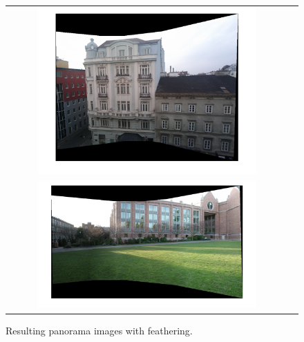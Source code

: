 \begin{figure}[h]
	\centering
	\begin{tabular}{cc}
	\includegraphics[width=0.8\textwidth]{figures/office_p.png} \\
	\includegraphics[width=0.8\textwidth]{figures/campus_p.png} 

	\end{tabular}
	\caption{Resulting panorama images with feathering.}
	\label{fig:a4:pano1}
\end{figure}

